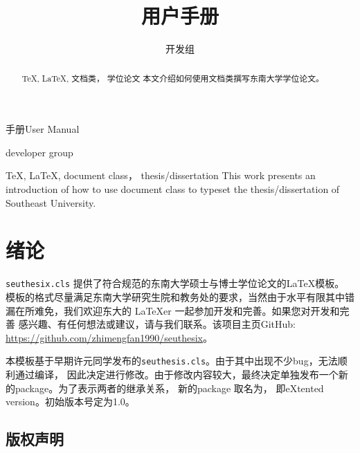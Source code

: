 ﻿\documentclass[figurelist,tablelist,algorithmlist,nomlist,masters]{seuthesix}
\begin{document}
\title{\seuthesix 用户手册}{手册}{\seuthesix User Manual}{\seuthesix}
\author{\seuthesix 开发组}{\seuthesix developer group}
\major{\TeX}
\submajor{\LaTeX}
\authorizedate{\today}
\makebigcover
\makecover
\begin{abstract}{\TeX, \LaTeX, 文档类， 学位论文}
本文介绍如何使用\seuthesix 文档类撰写东南大学学位论文。
\end{abstract}

\begin{englishabstract}{\TeX, \LaTeX, document class， thesis/dissertation}
 This work presents an introduction of how to use \seuthesix document class to typeset the thesis/dissertation of Southeast University.
\end{englishabstract}

\tableofcontents
\listofothers

\mainmatter

\chapter{绪论}
\verb+seuthesix.cls+ 提供了符合规范的东南大学硕士与博士学位论文的\LaTeX 模板。
模板的格式尽量满足东南大学研究生院和教务处的要求，当然由于水平有限其中错
漏在所难免，我们欢迎东大的 \LaTeX{er} 一起参加开发和完善。如果您对开发和完善\seuthesix
感兴趣、有任何想法或建议，请与我们联系。该项目主页GitHub:
\url{https://github.com/zhimengfan1990/seuthesix}。

本模板基于早期许元同学发布的\verb+seuthesis.cls+。由于其中出现不少bug，无法顺利通过编译，
因此决定进行修改。由于修改内容较大，最终决定单独发布一个新的package。为了表示两者的继承关系，
新的package 取名为\seuthesix， 即\seuthesis{ }eXtented version。\seuthesix 初始版本号定为1.0。

\section{版权声明}
\end{document}

